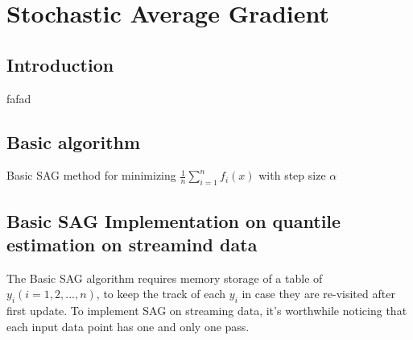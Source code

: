 \chapter{Stochastic Average Gradient}
\label{ch: SAG}

\section{Introduction}
fafad 

\section{Basic algorithm}

\begin{algorithm}
    \caption{Basic SAG method for minimizing $\frac{1}{n} \sum^n_{i=1}f_i(x)$ with step size $\alpha$}\label{alg:SAG_ori}
        \begin{algorithmic}[1]
                       
            \EndFor
        \end{algorithmic}
\end{algorithm}

\section{Basic SAG Implementation on quantile estimation on  streamind data}
The Basic SAG algorithm requires memory storage of a table of $y_i (i= 1, 2, ...,n)$, to keep the track of each $y_i$ in case they are re-visited after first update.
To implement SAG on streaming data, it's worthwhile noticing that each input data point has one and only one pass. 

